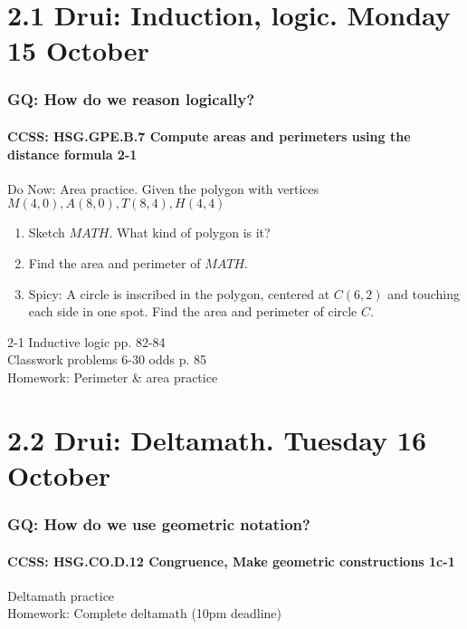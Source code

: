 \documentclass{beamer}
\begin{document}
\section{2.1 Drui: Induction, logic. Monday 15 October}
  \frame
  {
    \frametitle{GQ: How do we reason logically?}
    \framesubtitle{CCSS: HSG.GPE.B.7 Compute areas and perimeters using the distance formula  \alert{2-1}}

    \begin{block}{Do Now: Area practice. Given the polygon with vertices $M(4,0), A(8,0), T(8,4), H(4,4)$}
    \begin{enumerate}
        \item Sketch $MATH$. What kind of polygon is it?
        \item Find the area and perimeter of $MATH$.
        \item Spicy: A circle is inscribed in the polygon, centered at $C(6,2)$ and touching each side in one spot. Find the area and perimeter of circle $C$.
    \end{enumerate}
    \end{block}
    2-1 Inductive logic  pp. 82-84\\
    Classwork problems 6-30 odds p. 85\\
    \vspace{0.5cm}
    Homework: Perimeter \& area practice
  }


\section{2.2 Drui: Deltamath. Tuesday 16 October}
  \frame
  {
    \frametitle{GQ: How do we use geometric notation?}
    \framesubtitle{CCSS: HSG.CO.D.12 Congruence, Make geometric constructions  \alert{1c-1}}

    Deltamath practice\\ \bigskip
    Homework: Complete deltamath (10pm deadline)
  }
\end{document}
